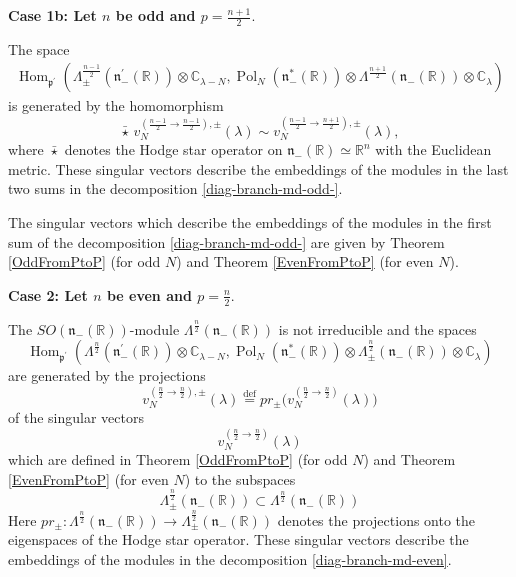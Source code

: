 \documentclass[a4paper,12pt,reqno]{amsart}
\numberwithin{theorem}{subsection}
\numberwithin{equation}{section}
\begin{document}
{\bf Case 1b: Let $n$ be odd and $p=\frac{n+1}{2}$}.

The space
\begin{align*}
   {\operatorname{Hom}}_{{{\mathfrak p}}^\prime}(\Lambda^{\frac{n-1}{2}}_\pm({{\mathfrak n}}_-^\prime({\mathbb{R}})) \otimes {\mathbb{C}}_{\lambda-N},
   {\operatorname{Pol}}_N({{\mathfrak n}}_-^*({\mathbb{R}})) \otimes \Lambda^{\frac{n+1}{2}}({{\mathfrak n}}_-({\mathbb{R}})) \otimes {\mathbb{C}}_\lambda)
\end{align*}
is generated by the homomorphism
\begin{equation}\label{sv-case2}
   \bar{\star} \, v_N^{(\frac{n-1}{2}\to \frac{n-1}{2}),\pm}(\lambda) \sim
   v_N^{(\frac{n-1}{2}\to \frac{n+1}{2}),\pm}(\lambda),
\end{equation}
where $\bar{\star}$ denotes the Hodge star operator on ${{\mathfrak n}}_-({\mathbb{R}}) \simeq {\mathbb{R}}^n$
with the Euclidean metric. These singular vectors describe the embeddings of
the modules in the last two sums in the decomposition
\eqref{diag-branch-md-odd-}.

The singular vectors which describe the embeddings of the modules in the first
sum of the decomposition \eqref{diag-branch-md-odd-} are given by Theorem
\ref{OddFromPtoP} (for odd $N$) and Theorem \ref{EvenFromPtoP} (for even $N$).

{\bf Case 2: Let $n$ be even and $p=\frac{n}{2}$}.

The $SO({{\mathfrak n}}_-({\mathbb{R}}))$-module $\Lambda^{\frac{n}{2}}({{\mathfrak n}}_-({\mathbb{R}}))$ is not
irreducible and the spaces
\begin{equation*}
   {\operatorname{Hom}}_{{{\mathfrak p}}^\prime}(\Lambda^{\frac{n}{2}}({{\mathfrak n}}_-^\prime({\mathbb{R}})) \otimes {\mathbb{C}}_{\lambda-N},
   {\operatorname{Pol}}_N({{\mathfrak n}}_-^*({\mathbb{R}})) \otimes \Lambda_\pm^{\frac{n}{2}}({{\mathfrak n}}_-({\mathbb{R}})) \otimes {\mathbb{C}}_\lambda)
\end{equation*}
are generated by the projections
\begin{equation}
   v_N^{(\frac{n}{2}\to \frac{n}{2}),\pm}(\lambda)
   {\stackrel{\text{def}}{=}} pr_{\pm}\big( v_N^{(\frac{n}{2}\to \frac{n}{2})}(\lambda)\big)
\end{equation}
of the singular vectors
$$
   v_N^{(\frac{n}{2} \to \frac{n}{2})}(\lambda)
$$
which are defined in Theorem \ref{OddFromPtoP} (for odd $N$) and Theorem
\ref{EvenFromPtoP} (for even $N$) to the subspaces
$$
   \Lambda^{\frac{n}{2}}_\pm({{\mathfrak n}}_-({\mathbb{R}})) \subset \Lambda^{\frac{n}{2}}({{\mathfrak n}}_-({\mathbb{R}}))
$$
Here $pr_\pm: \Lambda^{\frac{n}{2}}({{\mathfrak n}}_-({\mathbb{R}}))\to
\Lambda_\pm^{\frac{n}{2}}({{\mathfrak n}}_-({\mathbb{R}}))$ denotes the projections onto the
eigenspaces of the Hodge star operator. These singular vectors describe the
embeddings of the modules in the decomposition \eqref{diag-branch-md-even}.
\smallskip
\end{document}
